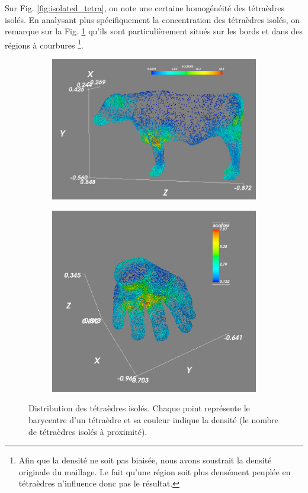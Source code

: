 \noindent
Sur Fig. \ref{fig:isolated_tetra}, on note une certaine homogénéité des tétraèdres isolés. En analysant plus spécifiquement la concentration des tétraèdres isolés, on remarque sur la Fig. \ref{fig:density_cow_hand} qu'ils sont particulièrement situés sur les bords et dans des régions à courbures \footnote{Afin que la densité ne soit pas biaisée, nous avons soustrait la densité originale du maillage. Le fait qu'une région soit plus densément peuplée en tétraèdres n'influence donc pas le résultat.}.
\begin{figure}[H]
\centering
\begin{subfigure}{.5\textwidth}
  \centering
  \includegraphics[scale=0.25]{Images/density_cow}
\end{subfigure}%
\begin{subfigure}{.5\textwidth}
  \centering
  \includegraphics[scale=0.22]{Images/hand_density}
\end{subfigure}
\caption{Distribution des tétraèdres isolés. Chaque point représente le barycentre d'un tétraèdre et sa couleur indique la densité (le nombre de tétraèdres isolés à proximité).}
\label{fig:density_cow_hand}
\end{figure}

